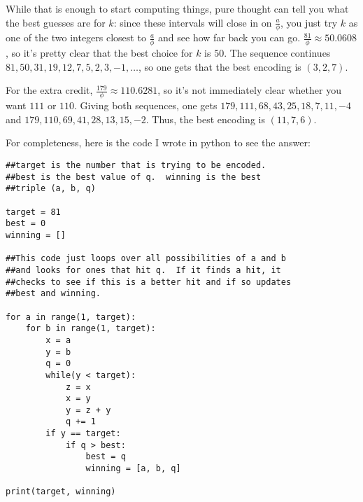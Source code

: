 \documentclass[11pt]{article}
\theoremstyle{definition}
\begin{document}
While that is enough to start computing things, pure thought can tell you what the best guesses are for $k$: since these intervals will close in on $\frac{a}{\phi}$, you just try $k$ as one of the two integers closest to $\frac{a}{\phi}$ and see how far back you can go.  $\frac{81}{\phi} \approx 50.0608$, so it's pretty clear that the best choice for $k$ is $50$.  The sequence continues $81, 50, 31, 19, 12, 7, 5, 2, 3, -1, \ldots$, so one gets that the best encoding is $(3, 2, 7)$.

For the extra credit, $\frac{179}{\phi}\approx 110.6281$, so it's not immediately clear whether you want $111$ or $110$.  Giving both sequences, one gets $179, 111, 68, 43, 25, 18, 7, 11, -4$ and $179, 110, 69, 41, 28, 13, 15, -2$.  Thus, the best encoding is $(11, 7, 6)$.

For completeness, here is the code I wrote in python to see the answer:
\begin{verbatim}
##target is the number that is trying to be encoded.
##best is the best value of q.  winning is the best
##triple (a, b, q)

target = 81
best = 0
winning = []

##This code just loops over all possibilities of a and b
##and looks for ones that hit q.  If it finds a hit, it
##checks to see if this is a better hit and if so updates
##best and winning.

for a in range(1, target):
    for b in range(1, target):
        x = a
        y = b
        q = 0
        while(y < target):
            z = x
            x = y
            y = z + y
            q += 1
        if y == target:
            if q > best:
                best = q
                winning = [a, b, q]

print(target, winning)
\end{verbatim}
\end{document}
